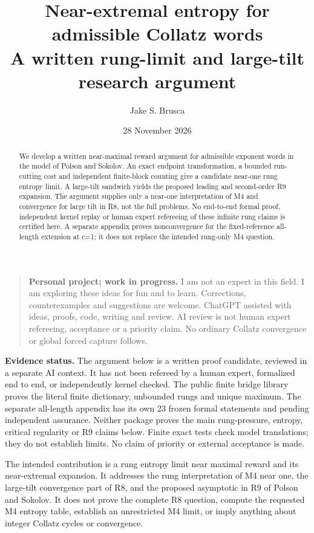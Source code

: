\documentclass[11pt,letterpaper]{article}
\title{Near-extremal entropy for admissible Collatz words\\[0.3em]\large A written rung-limit and large-tilt research argument}
\author{Jake S. Brusca}
\date{28 November 2026}
\begin{document}
\maketitle
\begin{abstract}
We develop a written near-maximal reward argument for admissible exponent
words in the model of Polson and Sokolov. An exact endpoint transformation,
a bounded run-cutting cost and independent finite-block counting give a
candidate near-one rung entropy limit. A large-tilt sandwich yields the
proposed leading and second-order R9 expansion. The argument supplies only a
near-one interpretation of M4 and convergence for large tilt in R8, not the
full problems. No end-to-end formal proof, independent kernel replay or human
expert refereeing of these infinite rung claims is certified here. A separate
appendix proves nonconvergence for the fixed-reference all-length extension
at c=1; it does not replace the intended rung-only M4 question.
\end{abstract}
\begin{quote}\small
\textbf{Personal project; work in progress.} I am not an expert in this field.
I am exploring these ideas for fun and to learn. Corrections, counterexamples
and suggestions are welcome. ChatGPT assisted with ideas, proofs, code,
writing and review. AI review is not human expert refereeing, acceptance or a
priority claim. No ordinary Collatz convergence or global forced capture follows.
\end{quote}
\textbf{Evidence status.} The argument below is a written proof candidate, reviewed in a separate AI context. It has not been refereed by a human expert, formalized end to end, or independently kernel checked. The public finite bridge library proves the literal finite dictionary, unbounded rungs and unique maximum. The separate all-length appendix has its own 23 frozen formal statements and pending independent assurance. Neither package proves the main rung-pressure, entropy, critical regularity or R9 claims below. Finite exact tests check model translations; they do not establish limits. No claim of priority or external acceptance is made.

The intended contribution is a rung entropy limit near maximal reward and its near-extremal expansion. It addresses the rung interpretation of M4 near one, the large-tilt convergence part of R8, and the proposed asymptotic in R9 of Polson and Sokolov. It does not prove the complete R8 question, compute the requested M4 entropy table, establish an unrestricted M4 limit, or imply anything about integer Collatz cycles or convergence.
\end{document}
